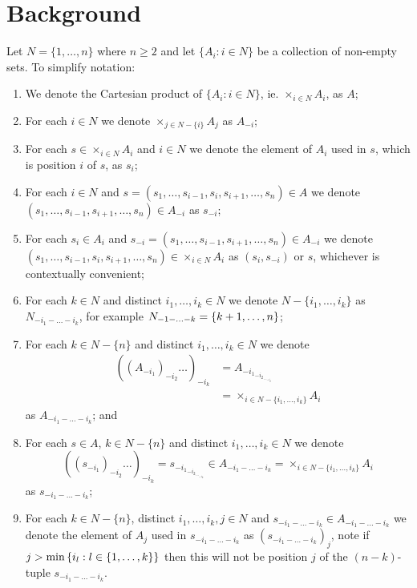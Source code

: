 \section{Background} \label{sec:background}
	Let $N = \{1, \ldots, n\}$ where $n \geq 2$ and let $\{A_i: i \in N\}$ be a collection of non-empty sets. To simplify notation:
	\begin{enumerate}
		\item We denote the Cartesian product of $\{A_i: i \in N\}$, ie. $\times_{i \in N}A_i$, as $A$;
		\item For each $i \in N$ we denote $\times_{j \in N-\{i\}} A_j$ as $A_{-i}$;
		\item For each $s \in \times_{i \in N}A_i$ and $i \in N$ we denote the element of $A_i$ used in $s$, which is position $i$ of $s$, as $s_i$;
		\item For each $i \in N$ and $s = (s_1, \ldots, s_{i-1}, s_i, s_{i+1}, \ldots, s_n) \in A$ we denote $(s_1, \ldots, s_{i-1}, s_{i+1}, \ldots, s_n) \in A_{-i}$ as $s_{-i}$;
		\item For each $s_i \in A_i$ and $s_{-i} = (s_1, \ldots, s_{i-1}, s_{i+1}, \ldots, s_n) \in A_{-i}$ we denote $(s_1, \ldots, s_{i-1}, s_i, s_{i+1}, \ldots, s_n) \in \times_{i \in N} A_i$ as $(s_i, s_{-i})$ or $s$, whichever is contextually convenient;
		\item For each $k \in N$ and distinct $i_1, \ldots, i_k \in N$ we denote $N - \{i_1, \ldots, i_k\}$ as $N_{-i_1 - \ldots - i_k}$, for example $N_{-1 - \ldots - k} = \left\{k+1, \ldots, n\right\}$;
		\item For each $k \in N-\{n\}$ and distinct $i_1, \ldots, i_k \in N$ we denote
		\begin{align*}
			{\left({(A_{-i_1})}_{-i_2}\ldots\right)}_{-i_k} &= A_{{-i_1}_{{-i_2}_{\ldots_{-i_k}}}} \\
			&= \times_{i \in N-\{i_1, \ldots, i_k\}}A_i	
		\end{align*}
		as $A_{-i_1 - \ldots - i_k}$; and
		\item For each $s \in A$, $k \in N-\{n\}$ and distinct $i_1, \ldots, i_k \in N$ we denote \[{\left({(s_{-i_1})}_{-i_2}\ldots\right)}_{-i_k} = s_{{-i_1}_{{-i_2}_{\ldots_{-i_k}}}} \in A_{-i_1 - \ldots - i_k} = \times_{i \in N-\{i_1, \ldots, i_k\}}A_i\] as $s_{-i_1 - \ldots - i_k}$;
		\item For each $k \in N-\{n\}$, distinct $i_1, \ldots, i_k, j \in N$ and $s_{-i_1 - \ldots - i_k} \in A_{-i_1 - \ldots - i_k}$ we denote the element of $A_j$ used in $s_{-i_1 - \ldots - i_k}$ as ${(s_{-i_1 - \ldots - i_k})}_j$, note if $j>\min\left\{i_l: l\in\{1, \ldots, k\}\right\}$ then this will not be position $j$ of the $(n-k)$-tuple $s_{-i_1 - \ldots - i_k}$.
	\end{enumerate}
	
